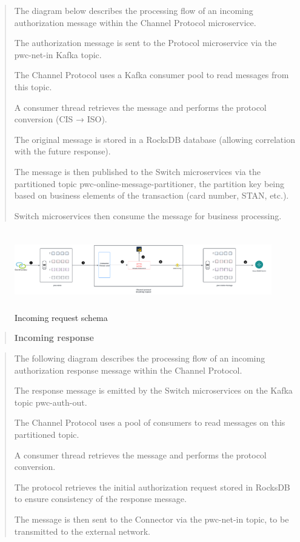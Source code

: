 \documentclass[12pt,a4paper]{report}
\begin{document}
\begin{quote}
The diagram below describes the processing flow of an incoming
authorization message within the Channel Protocol microservice.

The authorization message is sent to the Protocol microservice via the
pwc-net-in Kafka topic.

The Channel Protocol uses a Kafka consumer pool to read messages from
this topic.

A consumer thread retrieves the message and performs the protocol
conversion (CIS → ISO).

The original message is stored in a RocksDB database (allowing
correlation with the future response).

The message is then published to the Switch microservices via the
partitioned topic pwc-online-message-partitioner, the partition key
being based on business elements of the transaction (card number, STAN,
etc.).

Switch microservices then consume the message for business processing.
\end{quote}

\begin{figure}[H]
\centering
\includegraphics[width=6.95121in,height=1.35379in]{media/image57.png}
\caption{Incoming request schema}
\label{fig:IRS}
\end{figure}


\begin{quote}
\textbf{Incoming response}
\end{quote}


\begin{quote}
The following diagram describes the processing flow of an incoming
authorization response message within the Channel Protocol.

The response message is emitted by the Switch microservices on the Kafka
topic pwc-auth-out.

The Channel Protocol uses a pool of consumers to read messages on this
partitioned topic.

A consumer thread retrieves the message and performs the protocol
conversion.

The protocol retrieves the initial authorization request stored in
RocksDB to ensure consistency of the response message.

The message is then sent to the Connector via the pwc-net-in topic, to
be transmitted to the external network.
\end{quote}
\end{document}
